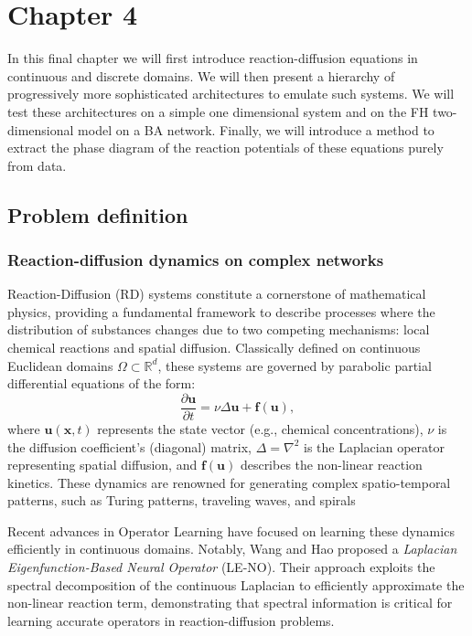 \chapter{Chapter 4}

In this final chapter we will first introduce reaction-diffusion equations in continuous and discrete domains. We will then present a hierarchy of progressively more sophisticated architectures to emulate such systems. We will test these architectures on a simple one dimensional system and on the FH two-dimensional model on a BA network. Finally, we will introduce a method to extract the phase diagram of the reaction potentials of these equations purely from data.

\section{Problem definition}
\subsection{Reaction-diffusion dynamics on complex networks}

Reaction-Diffusion (RD) systems constitute a cornerstone of mathematical physics, 
providing a fundamental framework to describe processes where the distribution of substances changes due to two competing mechanisms: 
local chemical reactions and spatial diffusion. Classically defined on continuous Euclidean domains $\Omega \subset \mathbb{R}^d$, 
these systems are governed by parabolic partial differential equations of the form:
\begin{equation}
    \frac{\partial \mathbf{u}}{\partial t} = \nu \Delta \mathbf{u} + \mathbf{f}(\mathbf{u}),
\end{equation}
where $\mathbf{u}(\mathbf{x},t)$ represents the state vector (e.g., chemical concentrations), $\nu$ is the diffusion coefficient's (diagonal) matrix, $\Delta = \nabla^2$ is the
Laplacian operator representing spatial diffusion, and $\mathbf{f}(\mathbf{u})$ describes the non-linear reaction kinetics. 
These dynamics are renowned for generating complex spatio-temporal patterns, such as Turing patterns, traveling waves, and spirals \cite{turing1952chemical,nakao2010turing}

Recent advances in Operator Learning have focused on learning these dynamics efficiently in continuous domains. Notably, Wang and Hao \cite{wang2025laplacian} proposed 
a \textit{Laplacian Eigenfunction-Based Neural Operator} (LE-NO). Their approach exploits the spectral decomposition of the continuous 
Laplacian to efficiently approximate the non-linear reaction term, demonstrating that spectral information is critical for learning accurate operators in 
reaction-diffusion problems.

